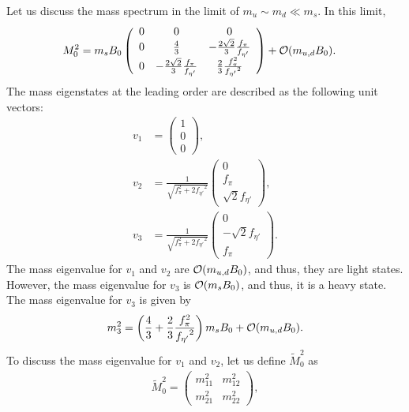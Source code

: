 \documentclass[11pt,a4paper]{article}
\begin{document}
Let us discuss the mass spectrum in the limit of $m_u \sim m_d \ll m_s$. In this limit,
\begin{align}
    M_0^2 &= m_s B_0 \left(\begin{array}{ccc}
        0 & 0 & 0 \\
        0 & \frac{4}{3} & -\frac{2\sqrt 2}{3} \frac{f_\pi}{f_{\eta'}} \\
        0 & -\frac{2\sqrt 2}{3} \frac{f_\pi}{f_{\eta'}} & \frac{2}{3} \frac{f_\pi^2}{{f_{\eta'}}^2} \\
    \end{array}\right) + {\cal O}(m_{u,d}B_0).
\end{align}
The mass eigenstates at the leading order are described as the following unit vectors:
\begin{align}
    v_1 &= \left(\begin{array}{c} 1 \\ 0 \\ 0 \end{array}\right), \\
    v_2 &= \frac{1}{\sqrt{f_\pi^2 + 2{f_{\eta'}}^2}} \left(\begin{array}{c} 0 \\ f_\pi \\ \sqrt{2}f_{\eta'} \end{array}\right), \\
    v_3 &= \frac{1}{\sqrt{f_\pi^2 + 2{f_{\eta'}}^2}} \left(\begin{array}{c} 0 \\ -\sqrt{2}f_{\eta'} \\ f_\pi \end{array}\right).
\end{align}
The mass eigenvalue for $v_1$ and $v_2$ are ${\cal O}(m_{u,d}B_0)$, and thus, they are light states. However, the mass eigenvalue for $v_3$ is ${\cal O}(m_s B_0)$, and thus, it is a heavy state.
The mass eigenvalue for $v_3$ is given by
\begin{align}
    m_3^2 = \left( \frac{4}{3} + \frac{2}{3} \frac{f_\pi^2}{{f_{\eta'}}^2} \right) m_s B_0 + {\cal O}(m_{u,d}B_0).
\end{align}
To discuss the mass eigenvalue for $v_1$ and $v_2$, let us define $\tilde M_0^2$ as
\begin{align}
    \tilde M_0^2
    =
    \left(\begin{array}{cc}
        m_{11}^2 & m_{12}^2 \\
        m_{21}^2 & m_{22}^2 
    \end{array}\right),
\end{align}
\end{document}
